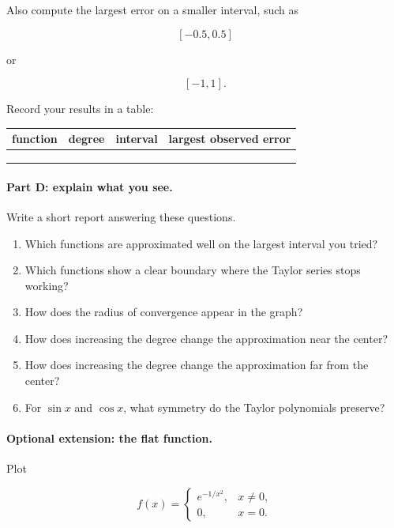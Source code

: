 Also compute the largest error on a smaller interval, such as

\[
[-0.5,0.5]
\]

or

\[
[-1,1].
\]

Record your results in a table:

\begin{center}
\renewcommand{\arraystretch}{1.35}
\begin{tabular}{c|c|c|c}
\textbf{function} & \textbf{degree} & \textbf{interval} & \textbf{largest observed error} \\ \hline
 & & & \\
 & & & \\
 & & &
\end{tabular}
\end{center}

\paragraph{Part D: explain what you see.}
Write a short report answering these questions.

\begin{enumerate}
\item Which functions are approximated well on the largest interval you tried?

\item Which functions show a clear boundary where the Taylor series stops working?

\item How does the radius of convergence appear in the graph?

\item How does increasing the degree change the approximation near the center?

\item How does increasing the degree change the approximation far from the center?

\item For \(\sin x\) and \(\cos x\), what symmetry do the Taylor polynomials preserve?
\end{enumerate}

\paragraph{Optional extension: the flat function.}
Plot

\[
f(x)=
\begin{cases}
e^{-1/x^2}, & x\neq0,\\
0, & x=0.
\end{cases}
\]

